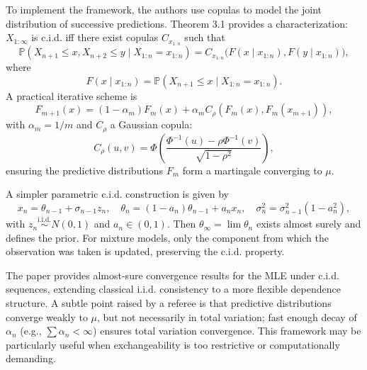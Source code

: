 \documentclass[11pt]{article}
\begin{document}
To implement the framework, the authors use copulas to model the joint distribution of successive predictions. Theorem 3.1 provides a characterization: $X_{1:\infty}$ is c.i.d. iff there exist copulas $C_{x_{1:n}}$ such that 
\[
\mathbb{P}(X_{n+1} \le x, X_{n+2} \le y \mid X_{1:n}=x_{1:n}) = C_{x_{1:n}}\big(F(x\mid x_{1:n}), F(y\mid x_{1:n})\big),
\]
where 
\[
F(x\mid x_{1:n}) = \mathbb{P}(X_{n+1} \le x \mid X_{1:n}=x_{1:n}).
\]
A practical iterative scheme is 
\[
F_{m+1}(x) = (1-\alpha_m)F_m(x) + \alpha_m C_\rho(F_m(x), F_m(x_{m+1})),
\]
with $\alpha_m = 1/m$ and $C_\rho$ a Gaussian copula:
\[
C_\rho(u,v) = \Phi\left( \frac{\Phi^{-1}(u) - \rho \Phi^{-1}(v)}{\sqrt{1-\rho^2}} \right),
\]
ensuring the predictive distributions $F_m$ form a martingale converging to $\mu$.

A simpler parametric c.i.d. construction is given by 
\[
x_{n} = \theta_{n-1} + \sigma_{n-1}z_n, \quad
\theta_n = (1-a_n)\theta_{n-1} + a_n x_n, \quad
\sigma_n^2 = \sigma_{n-1}^2(1-a_n^2),
\]
with $z_n \stackrel{\text{i.i.d.}}{\sim} N(0,1)$ and $a_n \in (0,1)$. Then $\theta_\infty = \lim \theta_n$ exists almost surely and defines the prior. For mixture models, only the component from which the observation was taken is updated, preserving the c.i.d. property.

The paper provides almost-sure convergence results for the MLE under c.i.d. sequences, extending classical i.i.d. consistency to a more flexible dependence structure. A subtle point raised by a referee is that predictive distributions converge weakly to $\mu$, but not necessarily in total variation; fast enough decay of $\alpha_n$ (e.g., $\sum \alpha_n < \infty$) ensures total variation convergence. This framework may be particularly useful when exchangeability is too restrictive or computationally demanding.
\end{document}
